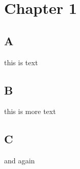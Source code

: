 \chapter{Chapter 1}
\minitoc%
\setcounter{page}{1}

\section{A}
this is text
\section{B}
this is more text
\section{C}
and again
